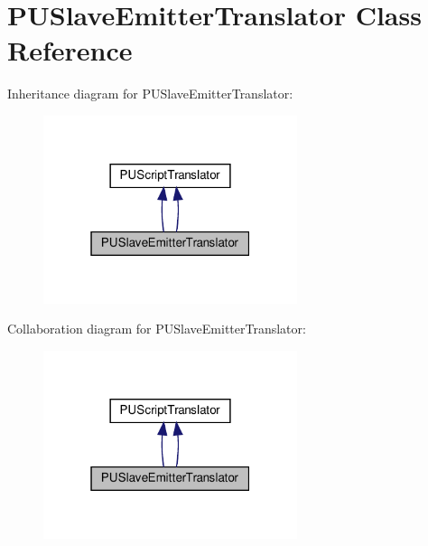 \hypertarget{classPUSlaveEmitterTranslator}{}\section{P\+U\+Slave\+Emitter\+Translator Class Reference}
\label{classPUSlaveEmitterTranslator}


Inheritance diagram for P\+U\+Slave\+Emitter\+Translator\+:
\nopagebreak
\begin{figure}[H]
\begin{center}
\leavevmode
\includegraphics[width=211pt]{classPUSlaveEmitterTranslator__inherit__graph}
\end{center}
\end{figure}


Collaboration diagram for P\+U\+Slave\+Emitter\+Translator\+:
\nopagebreak
\begin{figure}[H]
\begin{center}
\leavevmode
\includegraphics[width=211pt]{classPUSlaveEmitterTranslator__coll__graph}
\end{center}
\end{figure}
